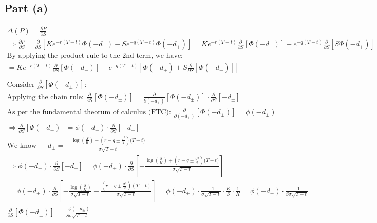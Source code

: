 \documentclass[letterpaper,10pt]{article}
\newcommand{\partiald}[2]{\frac{\partial #1}{\partial #2}}
\begin{document}
		\subsection{Part (a)}
			\begin{gather*}
				\Delta (P) = \partiald{P}{S} \\
				\Rightarrow \partiald{P}{S} = \partiald{}{S} \left[Ke^{-r(T-t)}\Phi(-d_{-}) - Se^{-q(T-t)}\Phi(-d_{+})\right] = Ke^{-r(T-t)}\partiald{}{S}\left[\Phi(-d_{-})\right] - e^{-q(T-t)}\partiald{}{S}\left[S\Phi(-d_{+})\right] \\
				\text{By applying the product rule to the 2nd term, we have:} \\
				= Ke^{-r(T-t)}\partiald{}{S}\left[\Phi(-d_{-})\right] - e^{-q(T-t)}\left[\Phi(-d_{+}) + S\partiald{}{S}\left[\Phi(-d_{+}) \right] \right] \\
				\\
				\text{Consider } \partiald{}{S} \left[\Phi (-d_{\pm})\right] \text{:} \\
				\text{Applying the chain rule: } \partiald{}{S} \left[\Phi (-d_{\pm})\right] = \partiald{}{(-d_{\pm})}\left[\Phi(-d_{\pm}) \right] \cdot \partiald{}{S}\left[ -d_{\pm}\right] \\
				\text{As per the fundamental theorum of calculus (FTC): } \partiald{}{(-d_{\pm})} \left[\Phi(-d_{\pm}) \right] = \phi(-d_{\pm}) \\
				\Rightarrow \partiald{}{S} \left[\Phi (-d_{\pm})\right] = \phi(-d_{\pm}) \cdot \partiald{}{S} \left[ -d_{\pm} \right] \\
				\text{We know } -d_{\pm} = - \frac{\log \left(\frac{S}{K}\right) + \left(r-q \pm \frac{\sigma^2}{2}\right) \big(T-t\big)}{\sigma\sqrt{T-t}} \\
				\Rightarrow \phi(-d_{\pm}) \cdot \partiald{}{S} \left[ -d_{\pm} \right] = \phi(-d_{\pm}) \cdot \partiald{}{S} \left[- \frac{\log \left(\frac{S}{K}\right) + \left(r-q \pm \frac{\sigma^2}{2}\right) \big(T-t\big)}{\sigma\sqrt{T-t}} \right] \\
				= \phi(-d_{\pm}) \cdot \partiald{}{S} \left[- \frac{\log \left( \frac{S}{K} \right)}{\sigma \sqrt{T-t}} - \frac{\left( r-q \pm \frac{\sigma^2}{2} \right)\left(T-t\right)}{\sigma \sqrt{T-t}} \right] = \phi(-d_{\pm}) \cdot \frac{-1}{\sigma \sqrt{T-t}} \cdot \frac{K}{S} \cdot \frac{1}{K} = \phi(-d_{\pm}) \cdot \frac{-1}{S\sigma\sqrt{T-t}} \\
				\partiald{}{S}\left[ \Phi(-d_\pm) \right] = \frac{-\phi(-d_\pm)}{S\sigma\sqrt{T-t}} \\
				\\

\end{gather*}
\end{document}
